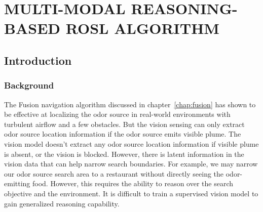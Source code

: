 \chapter{MULTI-MODAL REASONING-BASED ROSL ALGORITHM}\label{chap:LLM}



\section{Introduction}
\subsection{Background}\label{Subsec:LLMBackground}
The Fusion navigation algorithm discussed in chapter~\ref{chap:fusion} has shown to be effective at localizing the odor source in real-world environments with turbulent airflow and a few obstacles. But the vision sensing can only extract odor source location information if the odor source emits visible plume. The vision model doesn't extract any odor source location information if visible plume is absent, or the vision is blocked. However, there is latent information in the vision data that can help narrow search boundaries. For example, we may narrow our odor source search area to a restaurant without directly seeing the odor-emitting food. However, this requires the ability to reason over the search objective and the environment. It is difficult to train a supervised vision model to gain generalized reasoning capability.

